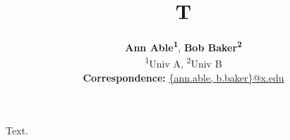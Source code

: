 \documentclass{article}
\title{T}
\author{\textbf{Ann Able\textsuperscript{1}}, \textbf{Bob Baker\textsuperscript{2}} \\ \textsuperscript{1}Univ A, \textsuperscript{2}Univ B \\ \small{\textbf{Correspondence:} \href{mailto:ann.able@x.edu}{\{ann.able, b.baker\}@x.edu}}}
\begin{document}
\maketitle
Text.
\end{document}
